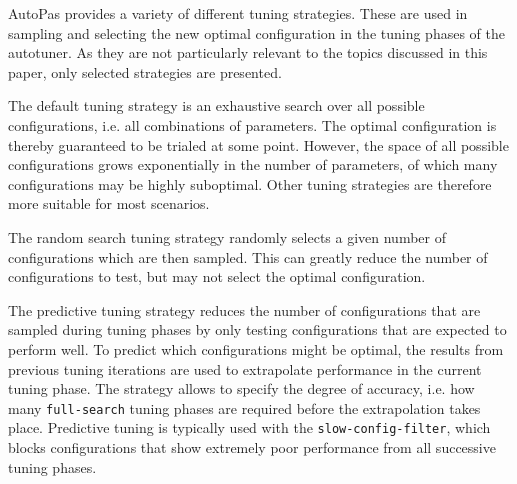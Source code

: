 AutoPas provides a variety of different tuning strategies. These are used in sampling and selecting the new optimal configuration in the tuning phases of the autotuner. As they are not particularly relevant to the topics discussed in this paper, only selected strategies are presented.
\begin{description}[leftmargin=!,labelwidth=\widthof{\textbf{PredictiveTuning }}]
	\item[\textbf{FullSearch}] The default tuning strategy is an exhaustive search over all possible configurations, i.e. all combinations of parameters. The optimal configuration is thereby guaranteed to be trialed at some point. However, the space of all possible configurations grows exponentially in the number of parameters, of which many configurations may be highly suboptimal. Other tuning strategies are therefore more suitable for most scenarios.
	\item[\textbf{RandomSearch}] The random search tuning strategy randomly selects a given number of configurations which are then sampled. This can greatly reduce the number of configurations to test, but may not select the optimal configuration.
	\item[\textbf{PredictiveTuning}] The predictive tuning strategy reduces the number of configurations that are sampled during tuning phases by only testing configurations that are expected to perform well. To predict which configurations might be optimal, the results from previous tuning iterations are used to extrapolate performance in the current tuning phase. The strategy allows to specify the degree of accuracy, i.e. how many \texttt{full-search} tuning phases are required before the extrapolation takes place. Predictive tuning is typically used with the \texttt{slow-config-filter}, which blocks configurations that show extremely poor performance from all successive tuning phases. \cite{Pelloth2020}
\end{description}



